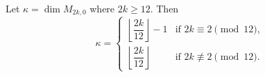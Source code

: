 Let $\kappa = \dim M_{2k,0}$ where $2k \geq 12$. Then
$$
\kappa = \begin{cases}
\left\lfloor \dfrac{2k}{12} \right\rfloor - 1 & \text{if } 2k \equiv 2 \pmod{12}, \\[10pt]
\left\lfloor \dfrac{2k}{12} \right\rfloor & \text{if } 2k \not\equiv 2 \pmod{12}.
\end{cases}
$$
